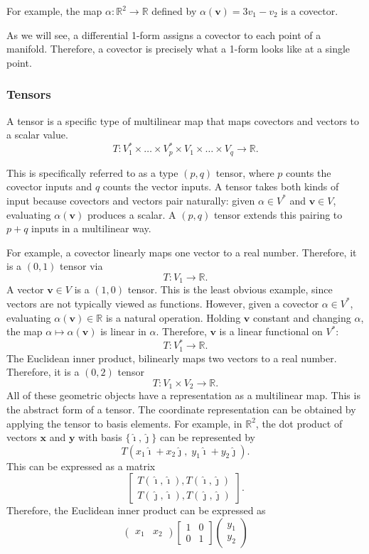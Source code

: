 \documentclass[12pt]{article}
\newcommand{\R}{\mathbb{R}}
\newcommand{\bv}[1]{\mathbf{#1}}
\newcommand{\ihat}{\hat{\imath}}
\newcommand{\jhat}{\hat{\jmath}}
\begin{document}
For example, the map $\alpha: \R^2 \to \R$ defined by $\alpha(\bv{v}) = 3v_1 - v_2$ is a covector.

As we will see, a differential 1-form assigns a covector to each point of a manifold. Therefore, a covector is precisely what a 1-form looks like at a single point.

\subsubsection{Tensors} 
A tensor is a specific type of multilinear map that maps covectors and vectors to a scalar value.
\[
T: V^*_1 \times \dots \times V^*_p \times V_1 \times \dots \times V_q \to \R.
\]

This is specifically referred to as a type $(p,q)$ tensor, where $p$ counts the covector inputs and $q$ counts the vector inputs. A tensor takes both kinds of input because covectors and vectors pair naturally: given $\alpha \in V^*$ and $\bv{v} \in V$, evaluating $\alpha(\bv{v})$ produces a scalar. A $(p,q)$ tensor extends this pairing to $p + q$ inputs in a multilinear way.

For example, a covector linearly maps one vector to a real number. Therefore, it is a $(0,1)$ tensor via
\[
T: V_1 \to \R.
\]
A vector $\bv{v} \in V$ is a $(1,0)$ tensor. This is the least obvious example, since vectors are not typically viewed as functions. However, given a covector $\alpha \in V^*$, evaluating $\alpha(\bv{v}) \in \R$ is a natural operation. Holding $\bv{v}$ constant and changing $\alpha$, the map $\alpha \mapsto \alpha(\bv{v})$ is linear in $\alpha$. Therefore, $\bv{v}$ is a linear functional on $V^*$:
\[
T: V^*_1 \to \R.
\]
The Euclidean inner product, bilinearly maps two vectors to a real number. Therefore, it is a $(0,2)$ tensor
\[
T:V_1 \times V_2 \to \R.
\]
All of these geometric objects have a representation as a multilinear map. This is the abstract form of a tensor. The coordinate representation can be obtained by applying the tensor to basis elements. For example, in $\R^2$, the dot product of vectors $\bv{x}$ and $\bv{y}$ with basis $\{\ihat, \jhat\}$ can be represented by
\[
T(x_1 \ihat + x_2 \jhat,\; y_1 \ihat + y_2 \jhat).
\]
This can be expressed as a matrix
\[
\begin{bmatrix} 
T(\ihat, \ihat), T(\ihat, \jhat) \\
T(\jhat, \ihat), T(\jhat, \jhat)
\end{bmatrix}.
\]
Therefore, the Euclidean inner product can be expressed as
\[
\begin{pmatrix}
x_1 & x_2
\end{pmatrix}
\begin{bmatrix}
1 & 0 \\
0 & 1
\end{bmatrix}
\begin{pmatrix}
y_1 \\
y_2
\end{pmatrix}
\]
\end{document}
